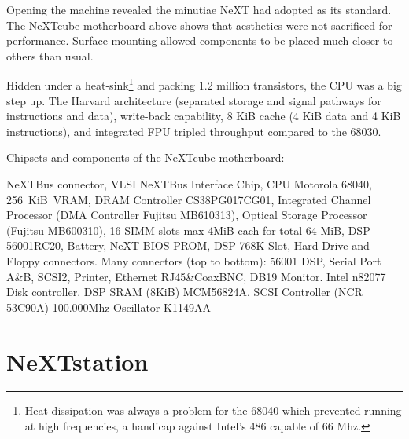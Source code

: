 \par
Opening the machine revealed the minutiae NeXT had adopted as its standard. The NeXTcube motherboard above shows that aesthetics were not sacrificed for performance. Surface mounting allowed components to be placed much closer to others than usual.\\
\par
Hidden under a heat-sink\footnote{Heat dissipation was always a problem for the 68040 which prevented running at high frequencies, a handicap against Intel's 486 capable of 66 Mhz.} and packing 1.2 million transistors, the CPU was a big step up. The Harvard architecture (separated storage and signal pathways for instructions and data), write-back capability, 8 KiB cache (4 KiB data and 4 KiB instructions), and integrated FPU tripled throughput compared to the 68030.





\vspace{50 mm}
\par
Chipsets and components of the NeXTcube motherboard:\\
\par 
{} NeXTBus connector,
 VLSI NeXTBus Interface Chip,
 CPU Motorola 68040,
 256~KiB~VRAM,
 DRAM Controller CS38PG017CG01,
 Integrated Channel Processor (DMA Controller Fujitsu MB610313),
 Optical Storage Processor (Fujitsu MB600310),
 16 SIMM slots max 4MiB each for total 64 MiB,
 DSP-56001RC20,
 Battery,
 NeXT BIOS PROM,
 DSP 768K Slot,
 Hard-Drive and Floppy connectors.
 Many connectors (top to bottom): 56001 DSP, Serial Port A\&B, SCSI2, Printer, Ethernet RJ45\&CoaxBNC, DB19 Monitor. 
 Intel n82077 Disk controller.
 DSP SRAM (8KiB) MCM56824A.
 SCSI Controller (NCR 53C90A)
 100.000Mhz Oscillator K1149AA






\section{NeXTstation}

